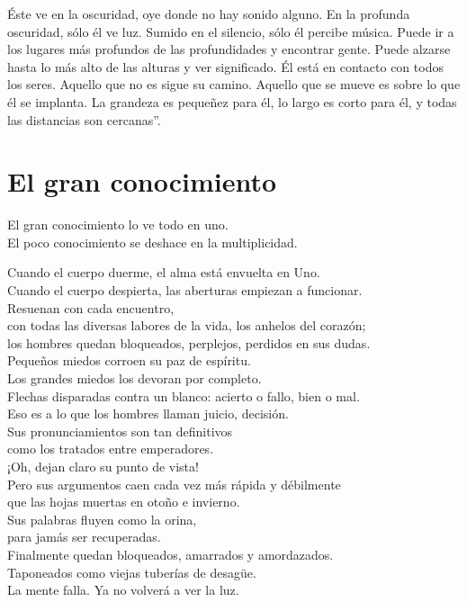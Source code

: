 \documentclass[book,b5paper,hidelinks,final]{memoir}
\begin{document}
	Éste ve en la oscuridad, oye donde no hay sonido alguno. En la profunda
	oscuridad, sólo él ve luz. Sumido en el silencio, sólo él percibe
	música. Puede ir a los lugares más profundos de las profundidades y
	encontrar gente. Puede alzarse hasta lo más alto de las alturas y ver
	significado. Él está en contacto con todos los seres. Aquello que no es
	sigue su camino. Aquello que se mueve es sobre lo que él se implanta. La
	grandeza es pequeñez para él, lo largo es corto para él, y todas las
	distancias son cercanas''.
	
	\chapter*{El gran conocimiento}
	
	El gran conocimiento lo ve todo en uno.\\
	El poco conocimiento se deshace en la multiplicidad.
	
	Cuando el cuerpo duerme, el alma está envuelta en Uno.\\
	Cuando el cuerpo despierta, las aberturas empiezan a funcionar.\\
	Resuenan con cada encuentro,\\
	con todas las diversas labores de la vida, los anhelos del corazón;\\
	los hombres quedan bloqueados, perplejos, perdidos en sus dudas.\\
	Pequeños miedos corroen su paz de espíritu.\\
	Los grandes miedos los devoran por completo.\\
	Flechas disparadas contra un blanco: acierto o fallo, bien o mal.\\
	Eso es a lo que los hombres llaman juicio, decisión.\\
	Sus pronunciamientos son tan definitivos\\
	como los tratados entre emperadores.\\
	¡Oh, dejan claro su punto de vista!\\
	Pero sus argumentos caen cada vez más rápida y débilmente\\
	que las hojas muertas en otoño e invierno.\\
	Sus palabras fluyen como la orina,\\
	para jamás ser recuperadas.\\
	Finalmente quedan bloqueados, amarrados y amordazados.\\
	Taponeados como viejas tuberías de desagüe.\\
	La mente falla. Ya no volverá a ver la luz.
	
\end{document}
